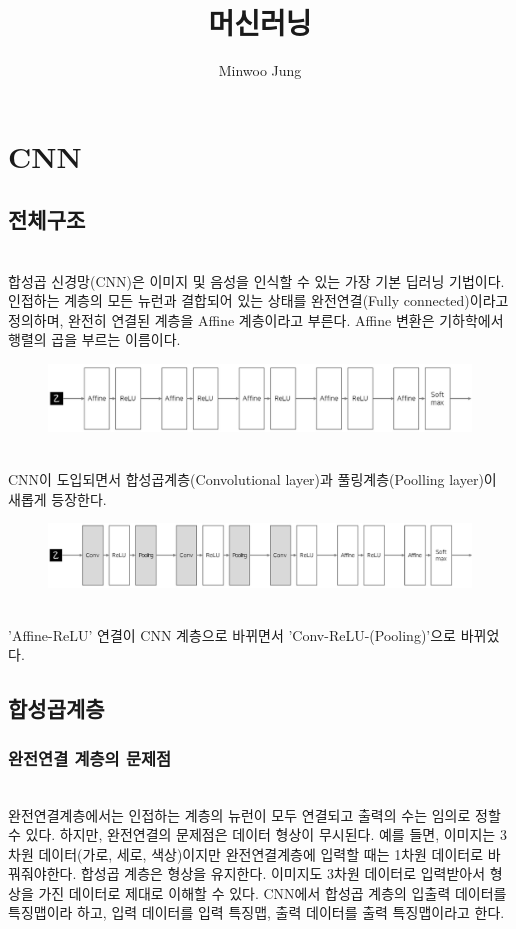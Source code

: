 \documentclass[11pt]{article}
\title{머신러닝}
\author{Minwoo Jung}
\begin{document}
\maketitle

\section{CNN}

\subsection{전체구조}

\indent \\합성곱 신경망(CNN)은 이미지 및 음성을 인식할 수 있는 가장 기본 딥러닝 기법이다. 인접하는 계층의 모든 뉴런과 결합되어 있는 상태를 완전연결(Fully connected)이라고 정의하며, 완전히 연결된 계층을 Affine 계층이라고 부른다. Affine 변환은 기하학에서 행렬의 곱을 부르는 이름이다. 
	\begin{figure}[h!]
		\includegraphics[width=1\columnwidth]{../Figure/Figure_1.pdf}
        \label{Fig.1}
	\end{figure}
\indent \\CNN이 도입되면서 합성곱계층(Convolutional layer)과 풀링계층(Poolling layer)이 새롭게 등장한다.  
    \begin{figure}[h!]
		\includegraphics[width=1\columnwidth]{../Figure/Figure_2.pdf}
        \label{Fig.2}
	\end{figure}	
\indent \\'Affine-ReLU' 연결이 CNN 계층으로 바뀌면서 'Conv-ReLU-(Pooling)'으로 바뀌었다.

\subsection{합성곱계층}

\subsubsection{완전연결 계층의 문제점}
\indent \\완전연결계층에서는 인접하는 계층의 뉴런이 모두 연결되고 출력의 수는 임의로 정할 수 있다. 하지만, 완전연결의 문제점은 데이터 형상이 무시된다. 예를 들면, 이미지는 3차원 데이터(가로, 세로, 색상)이지만 완전연결계층에 입력할 때는 1차원 데이터로 바꿔줘야한다. 합성곱 계층은 형상을 유지한다. 이미지도 3차원 데이터로 입력받아서 형상을 가진 데이터로 제대로 이해할 수 있다. CNN에서 합성곱 계층의 입출력 데이터를 특징맵이라 하고, 입력 데이터를 입력 특징맵, 출력 데이터를 출력 특징맵이라고  한다. 
\end{document}
